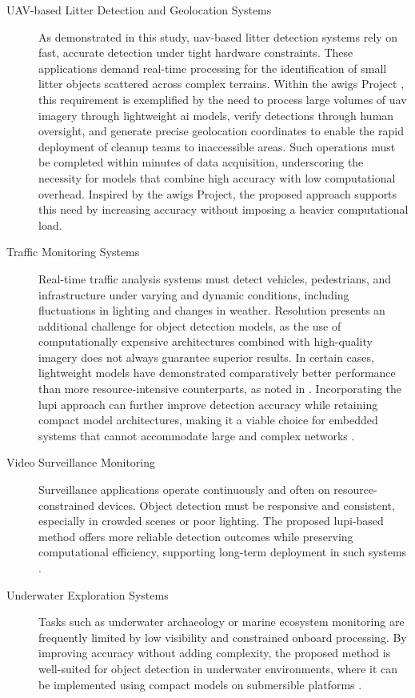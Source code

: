 \begin{description}

\item[UAV-based Litter Detection and Geolocation Systems]
As demonstrated in this study, \gls{uav}-based litter detection systems rely on fast, accurate detection under tight hardware constraints. These applications demand real-time processing for the identification of small litter objects scattered across complex terrains. Within the \gls{awigs} Project \cite{awigs_project}, this requirement is exemplified by the need to process large volumes of \gls{uav} imagery through lightweight \gls{ai} models, verify detections through human oversight, and generate precise geolocation coordinates to enable the rapid deployment of cleanup teams to inaccessible areas. Such operations must be completed within minutes of data acquisition, underscoring the necessity for models that combine high accuracy with low computational overhead. Inspired by the \gls{awigs} Project, the proposed approach supports this need by increasing accuracy without imposing a heavier computational load.

\item[Traffic Monitoring Systems]
Real-time traffic analysis systems must detect vehicles, pedestrians, and infrastructure under varying and dynamic conditions, including fluctuations in lighting and changes in weather. Resolution presents an additional challenge for object detection models, as the use of computationally expensive architectures combined with high-quality imagery does not always guarantee superior results. In certain cases, lightweight models have demonstrated comparatively better performance than more resource-intensive counterparts, as noted in \cite{Mark_Paper}. Incorporating the \gls{lupi} approach can further improve detection accuracy while retaining compact model architectures, making it a viable choice for embedded systems that cannot accommodate large and complex networks \cite{traffic_monitoring}.


\item[Video Surveillance Monitoring]
Surveillance applications operate continuously and often on resource-constrained devices. Object detection must be responsive and consistent, especially in crowded scenes or poor lighting. The proposed \gls{lupi}-based method offers more reliable detection outcomes while preserving computational efficiency, supporting long-term deployment in such systems \cite{surveillance}.

\item[Underwater Exploration Systems]
Tasks such as underwater archaeology or marine ecosystem monitoring are frequently limited by low visibility and constrained onboard processing. By improving accuracy without adding complexity, the proposed method is well-suited for object detection in underwater environments, where it can be implemented using compact models on submersible platforms \cite{underwater_archeology}.

\end{description}

